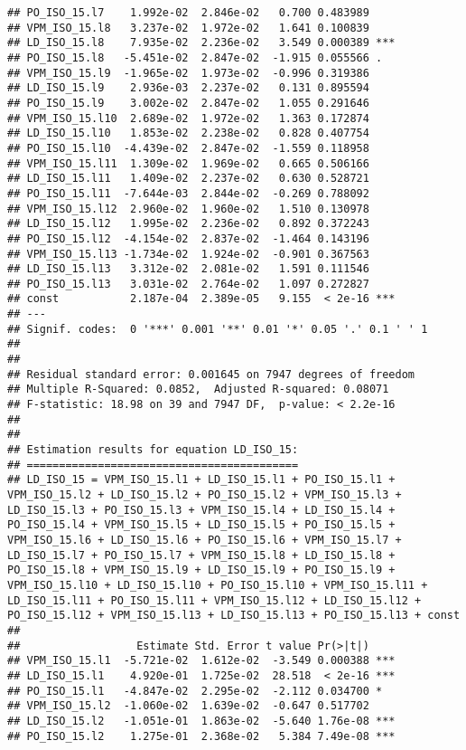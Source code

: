 \documentclass[
]{article}
\begin{document}
\begin{verbatim}
## PO_ISO_15.l7    1.992e-02  2.846e-02   0.700 0.483989    
## VPM_ISO_15.l8   3.237e-02  1.972e-02   1.641 0.100839    
## LD_ISO_15.l8    7.935e-02  2.236e-02   3.549 0.000389 ***
## PO_ISO_15.l8   -5.451e-02  2.847e-02  -1.915 0.055566 .  
## VPM_ISO_15.l9  -1.965e-02  1.973e-02  -0.996 0.319386    
## LD_ISO_15.l9    2.936e-03  2.237e-02   0.131 0.895594    
## PO_ISO_15.l9    3.002e-02  2.847e-02   1.055 0.291646    
## VPM_ISO_15.l10  2.689e-02  1.972e-02   1.363 0.172874    
## LD_ISO_15.l10   1.853e-02  2.238e-02   0.828 0.407754    
## PO_ISO_15.l10  -4.439e-02  2.847e-02  -1.559 0.118958    
## VPM_ISO_15.l11  1.309e-02  1.969e-02   0.665 0.506166    
## LD_ISO_15.l11   1.409e-02  2.237e-02   0.630 0.528721    
## PO_ISO_15.l11  -7.644e-03  2.844e-02  -0.269 0.788092    
## VPM_ISO_15.l12  2.960e-02  1.960e-02   1.510 0.130978    
## LD_ISO_15.l12   1.995e-02  2.236e-02   0.892 0.372243    
## PO_ISO_15.l12  -4.154e-02  2.837e-02  -1.464 0.143196    
## VPM_ISO_15.l13 -1.734e-02  1.924e-02  -0.901 0.367563    
## LD_ISO_15.l13   3.312e-02  2.081e-02   1.591 0.111546    
## PO_ISO_15.l13   3.031e-02  2.764e-02   1.097 0.272827    
## const           2.187e-04  2.389e-05   9.155  < 2e-16 ***
## ---
## Signif. codes:  0 '***' 0.001 '**' 0.01 '*' 0.05 '.' 0.1 ' ' 1
## 
## 
## Residual standard error: 0.001645 on 7947 degrees of freedom
## Multiple R-Squared: 0.0852,  Adjusted R-squared: 0.08071 
## F-statistic: 18.98 on 39 and 7947 DF,  p-value: < 2.2e-16 
## 
## 
## Estimation results for equation LD_ISO_15: 
## ========================================== 
## LD_ISO_15 = VPM_ISO_15.l1 + LD_ISO_15.l1 + PO_ISO_15.l1 + VPM_ISO_15.l2 + LD_ISO_15.l2 + PO_ISO_15.l2 + VPM_ISO_15.l3 + LD_ISO_15.l3 + PO_ISO_15.l3 + VPM_ISO_15.l4 + LD_ISO_15.l4 + PO_ISO_15.l4 + VPM_ISO_15.l5 + LD_ISO_15.l5 + PO_ISO_15.l5 + VPM_ISO_15.l6 + LD_ISO_15.l6 + PO_ISO_15.l6 + VPM_ISO_15.l7 + LD_ISO_15.l7 + PO_ISO_15.l7 + VPM_ISO_15.l8 + LD_ISO_15.l8 + PO_ISO_15.l8 + VPM_ISO_15.l9 + LD_ISO_15.l9 + PO_ISO_15.l9 + VPM_ISO_15.l10 + LD_ISO_15.l10 + PO_ISO_15.l10 + VPM_ISO_15.l11 + LD_ISO_15.l11 + PO_ISO_15.l11 + VPM_ISO_15.l12 + LD_ISO_15.l12 + PO_ISO_15.l12 + VPM_ISO_15.l13 + LD_ISO_15.l13 + PO_ISO_15.l13 + const 
## 
##                  Estimate Std. Error t value Pr(>|t|)    
## VPM_ISO_15.l1  -5.721e-02  1.612e-02  -3.549 0.000388 ***
## LD_ISO_15.l1    4.920e-01  1.725e-02  28.518  < 2e-16 ***
## PO_ISO_15.l1   -4.847e-02  2.295e-02  -2.112 0.034700 *  
## VPM_ISO_15.l2  -1.060e-02  1.639e-02  -0.647 0.517702    
## LD_ISO_15.l2   -1.051e-01  1.863e-02  -5.640 1.76e-08 ***
## PO_ISO_15.l2    1.275e-01  2.368e-02   5.384 7.49e-08 ***

\end{verbatim}
\end{document}
